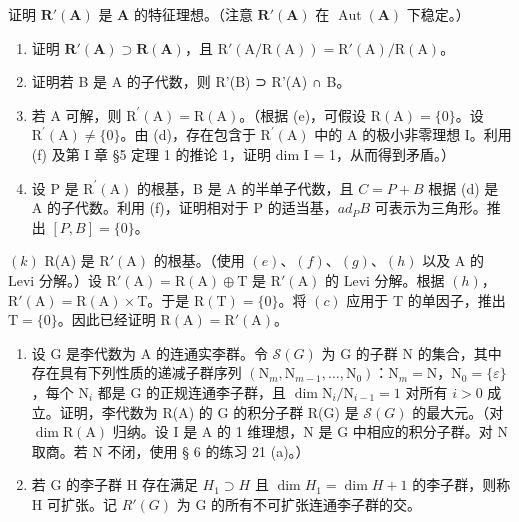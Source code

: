 证明 \(\mathbf{R}'(\mathbf{A})\) 是 \(\mathbf{A}\) 的特征理想。（注意 \(\mathbf{R}'(\mathbf{A})\) 在 \(\operatorname{Aut}(\mathbf{A})\) 下稳定。）

\begin{enumerate}
\def\labelenumi{(\alph{enumi})}
\setcounter{enumi}{4}
\item
  证明 \(\mathbf{R}'(\mathbf{A})\supset \mathbf{R}(\mathbf{A})\)，且 \(\mathrm{R}'(\mathrm{A} / \mathrm{R}(\mathrm{A})) = \mathrm{R}'(\mathrm{A}) / \mathrm{R}(\mathrm{A})\)。
\item
  证明若 B 是 A 的子代数，则 R'(B) ⊃ R'(A) ∩ B。
\item
  若 A 可解，则 \(\mathrm{R}^{\prime}(\mathrm{A}) = \mathrm{R}(\mathrm{A})\)。（根据 (e)，可假设 \(\mathrm{R}(\mathrm{A}) = \{0\}\)。设 \(\mathrm{R}^{\prime}(\mathrm{A}) \neq \{0\}\)。由 (d)，存在包含于 \(\mathrm{R}^{\prime}(\mathrm{A})\) 中的 A 的极小非零理想 I。利用 (f) 及第 I 章 §5 定理 1 的推论 1，证明 dim I = 1，从而得到矛盾。）
\item
  设 P 是 \(\mathrm{R}^{\prime}(\mathrm{A})\) 的根基，B 是 A 的半单子代数，且 \(C = P + B\) 根据 (d) 是 A 的子代数。利用 (f)，证明相对于 P 的适当基，\(ad_{P}B\) 可表示为三角形。推出 \([P, B] = \{0\}\)。
\end{enumerate}

\((k)\) R(A) 是 \(\mathrm{R}'(\mathrm{A})\) 的根基。（使用 \((e)\)、\((f)\)、\((g)\)、\((h)\) 以及 A 的 Levi 分解。）设 \(\mathrm{R}'(\mathrm{A}) = \mathrm{R}(\mathrm{A}) \oplus \mathrm{T}\) 是 \(\mathrm{R}'(\mathrm{A})\) 的 Levi 分解。根据 \((h)\)，\(\mathrm{R}'(\mathrm{A}) = \mathrm{R}(\mathrm{A}) \times \mathrm{T}\)。于是 \(\mathrm{R}(\mathrm{T}) = \{0\}\)。将 \((c)\) 应用于 T 的单因子，推出 \(\mathrm{T} = \{0\}\)。因此已经证明 \(\mathrm{R}(\mathrm{A}) = \mathrm{R}'(\mathrm{A})\)。

\begin{enumerate}
\def\labelenumi{(\alph{enumi})}
\setcounter{enumi}{11}
\item
  设 G 是李代数为 A 的连通实李群。令 \(\mathcal{S}(G)\) 为 G 的子群 N 的集合，其中存在具有下列性质的递减子群序列 \((\mathrm{N}_m, \mathrm{N}_{m-1}, \ldots, \mathrm{N}_0)\)：\(\mathrm{N}_m = \mathrm{N}\)，\(\mathrm{N}_0 = \{\varepsilon\}\)，每个 \(\mathrm{N}_i\) 都是 G 的正规连通李子群，且 \(\dim \mathrm{N}_i / \mathrm{N}_{i-1} = 1\) 对所有 \(i > 0\) 成立。证明，李代数为 R(A) 的 G 的积分子群 R(G) 是 \(\mathcal{S}(G)\) 的最大元。（对 \(\dim \mathrm{R(A)}\) 归纳。设 I 是 A 的 1 维理想，N 是 G 中相应的积分子群。对 N 取商。若 N 不闭，使用 § 6 的练习 21 (a)。）
\item
  若 G 的李子群 H 存在满足 \(H_{1} \supset H\) 且 \(\dim H_{1} = \dim H + 1\) 的李子群，则称 H 可扩张。记 \(R'(G)\) 为 G 的所有不可扩张连通李子群的交。
\end{enumerate}

